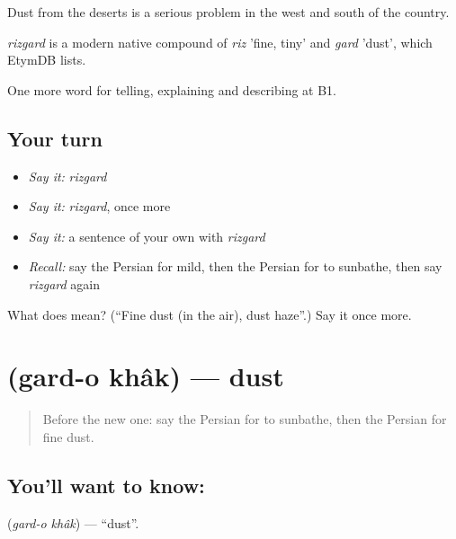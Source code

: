 Dust from the deserts is a serious problem in the west and south of the country.

\begin{cousinweb}
\emph{rizgard} is a modern native compound of \emph{riz} 'fine, tiny' and \emph{gard} 'dust', which EtymDB lists.
\end{cousinweb}

\begin{grammarlens}[title={What you've built}]
One more word for telling, explaining and describing at B1.
\end{grammarlens}

\subsection*{Your turn}
\begin{itemize}
\raggedright
  \item \emph{Say it:} \emph{rizgard}
  \item \emph{Say it:} \emph{rizgard}, once more
  \item \emph{Say it:} a sentence of your own with \emph{rizgard}
  \item \emph{Recall:} say the Persian for mild, then the Persian for to sunbathe, then say \emph{rizgard} again
\end{itemize}

\begin{tcolorbox}[breakable,colback=teal!4,colframe=teal!35!black,title={Before you move on}]
What does  mean? (\textquotedblleft{}Fine dust (in the air), dust haze\textquotedblright{}.) Say it once more.
\end{tcolorbox}
\section[\texorpdfstring{\fa{گرد} \fa{و} \fa{خاک} (gard-o khâk)}{گرد و خاک (gard-o khâk)}]{   (gard-o khâk) — dust}

\label{lesson:FA-C478-gard-o-khak}



\begin{quote}
Before the new one: say the Persian for to sunbathe, then the Persian for fine dust.
\end{quote}

\subsection*{You'll want to know:   }
\textbf{  } (\emph{gard-o khâk}) — \textquotedblleft{}dust\textquotedblright{}.

